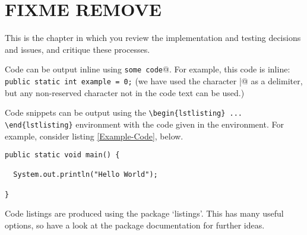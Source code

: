 \documentclass[../report.tex]{subfiles}
\begin{document}

\section{FIXME REMOVE}
This is the chapter in which you review the implementation and testing decisions and issues, and critique these processes.

Code can be output inline using \verb@\lstinline|some code|@.  For example, this code is inline: \lstinline|public static int example = 0;| (we have used the character \verb@|@ as a delimiter, but any non-reserved character not in the code text can be used.)

Code snippets can be output using the \verb|\begin{lstlisting} ... \end{lstlisting}|
environment with the code given in the environment. For example, consider listing \ref{Example-Code}, below.

\begin{lstlisting}[breaklines,breakatwhitespace,caption={Example code},label=Example-Code]
public static void main() {

  System.out.println("Hello World");

}
\end{lstlisting}

Code listings are produced using the package `listings'.  This has many useful options, so have a look at the package documentation for further ideas.
\end{document}
